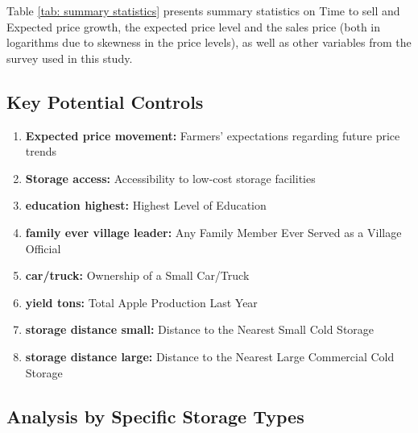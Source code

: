 \documentclass[12pt]{article}
\begin{document}
Table \ref{tab: summary statistics} presents summary statistics on Time to sell and Expected price growth, the expected price level and the sales price (both in logarithms due to skewness in the price levels), as well as other variables from the survey used in this study.


\subsection{Key Potential Controls}
\begin{enumerate}
    \item \textbf{Expected price movement:} Farmers’ expectations regarding future price trends
    \item \textbf{Storage access:} Accessibility to low-cost storage facilities
    \item \textbf{education highest:} Highest Level of Education
    \item \textbf{family ever village leader:} Any Family Member Ever Served as a Village Official
    \item \textbf{car/truck:} Ownership of a Small Car/Truck
    \item \textbf{yield tons:} Total Apple Production Last Year
    \item \textbf{storage distance small:} Distance to the Nearest Small Cold Storage
    \item \textbf{storage distance large:} Distance to the Nearest Large Commercial Cold Storage
\end{enumerate}












\newpage
\subsection{Analysis by Specific Storage Types}


\end{document}

